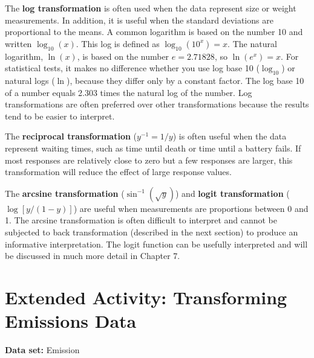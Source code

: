 \documentclass[
]{report}
\begin{document}
The \textbf{log transformation} is often used when the data represent size or weight measurements. In addition, it is useful when the standard deviations are proportional to the means. A common logarithm is based on the number 10 and written \(\log_{10}(x)\). This log is defined as \(\log_{10}(10^x) = x\). The natural logarithm, \(\ln(x)\), is based on the number \(e = 2.71828\), so \(\ln(e^x) = x\). For statistical tests, it makes no difference whether you use log base 10 (\(\log_{10}\)) or natural logs (\(\ln\)), because they differ only by a constant factor. The log base 10 of a number equals 2.303 times the natural log of the number. Log transformations are often preferred over other transformations because the results tend to be easier to interpret.

The \textbf{reciprocal transformation} (\(y^{-1} = 1/y\)) is often useful when the data represent waiting times, such as time until death or time until a battery fails. If most responses are relatively close to zero but a few responses are larger, this transformation will reduce the effect of large response values.

The \textbf{arcsine transformation} (\(\sin^{-1}(\sqrt{y})\)) and \textbf{logit transformation} (\(\log[y/(1-y)]\)) are useful when measurements are proportions between 0 and 1. The arcsine transformation is often difficult to interpret and cannot be subjected to back transformation (described in the next section) to produce an informative interpretation. The logit function can be usefully interpreted and will be discussed in much more detail in Chapter 7.

\hypertarget{extended-activity-transforming-emissions-data}{%
\section*{Extended Activity: Transforming Emissions Data}\label{extended-activity-transforming-emissions-data}}

\textbf{Data set:} Emission
\end{document}
